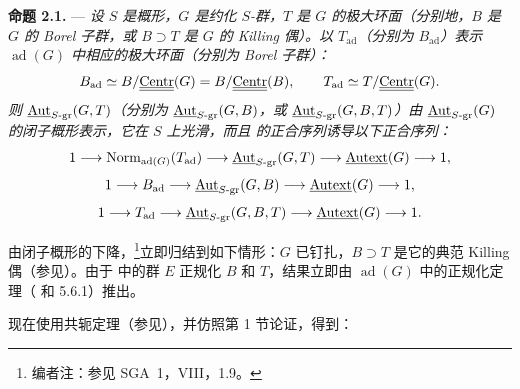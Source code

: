 \medskip\noindent\textbf{命题 2.1.} ---
{\itshape 设 \(S\) 是概形，\(G\) 是约化 \(S\)-群，\(T\) 是 \(G\) 的极大环面（分别地，\(B\) 是 \(G\) 的 Borel 子群，或 \(B\supset T\) 是 \(G\) 的 Killing 偶）。以 \(T_{\mathrm{ad}}\)（分别为 \(B_{\mathrm{ad}}\)）表示 \(\operatorname{ad}(G)\) 中相应的极大环面（分别为 Borel 子群）：
\[
  B_{\mathrm{ad}}
  \simeq B/\underline{\underline{\operatorname{Centr}}}(G)
  =B/\underline{\underline{\operatorname{Centr}}}(B),
  \qquad
  T_{\mathrm{ad}}\simeq T/\underline{\underline{\operatorname{Centr}}}(G).
\]
则 \(\underline{\operatorname{Aut}}_{S\text{-}\mathrm{gr}}(G,T)\)（分别为 \(\underline{\operatorname{Aut}}_{S\text{-}\mathrm{gr}}(G,B)\)，或 \(\underline{\operatorname{Aut}}_{S\text{-}\mathrm{gr}}(G,B,T)\)）由 \(\underline{\operatorname{Aut}}_{S\text{-}\mathrm{gr}}(G)\) 的闭子概形表示，它在 \(S\) 上光滑，而且 的正合序列诱导以下正合序列：
\[
  1\longrightarrow
  \operatorname{Norm}_{\operatorname{ad}(G)}(T_{\mathrm{ad}})
  \longrightarrow
  \underline{\operatorname{Aut}}_{S\text{-}\mathrm{gr}}(G,T)
  \longrightarrow
  \underline{\operatorname{Autext}}(G)
  \longrightarrow1,
\]
\[
  1\longrightarrow B_{\mathrm{ad}}
  \longrightarrow
  \underline{\operatorname{Aut}}_{S\text{-}\mathrm{gr}}(G,B)
  \longrightarrow
  \underline{\operatorname{Autext}}(G)
  \longrightarrow1,
\]
\[
  1\longrightarrow T_{\mathrm{ad}}
  \longrightarrow
  \underline{\operatorname{Aut}}_{S\text{-}\mathrm{gr}}(G,B,T)
  \longrightarrow
  \underline{\operatorname{Autext}}(G)
  \longrightarrow1.
\]}

由闭子概形的下降，\footnote{编者注：参见 SGA~1，VIII，1.9。}立即归结到如下情形：\(G\) 已钉扎，\(B\supset T\) 是它的典范 Killing 偶（参见）。由于  中的群 \(E\) 正规化 \(B\) 和 \(T\)，结果立即由 \(\operatorname{ad}(G)\) 中的正规化定理（ 和 5.6.1）推出。

现在使用共轭定理（参见），并仿照第 1 节论证，得到：

